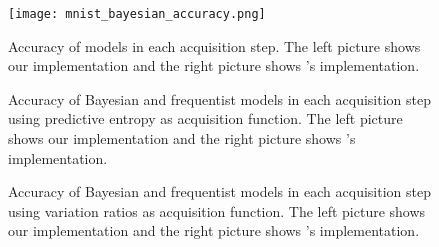 \begin{figure}[H]
    \centering
    \texttt{[image: mnist\_bayesian\_accuracy.png]}
    \caption{Accuracy of models in each acquisition step. The left picture shows our implementation and the right picture shows \citeauthor{Gal2016Active}'s implementation.}
    \label{fig:mnist_comparison_active_learning_random}
\end{figure}

\begin{figure}[H]
  \centering
  \hfill
  \caption{Accuracy of Bayesian and frequentist models in each acquisition step using predictive entropy as acquisition function. The left picture shows our implementation and the right picture shows \citeauthor{Gal2016Active}'s implementation.}
  \label{fig:mnist_pred_entropy_AL}
\end{figure}


\begin{figure}[H]
  \centering
  \hfill
  \caption{Accuracy of Bayesian and frequentist models in each acquisition step using variation ratios as acquisition function. The left picture shows our implementation and the right picture shows \citeauthor{Gal2016Active}'s implementation.}
  \label{fig:mnist_var_ratios_AL}
\end{figure}


%
%

